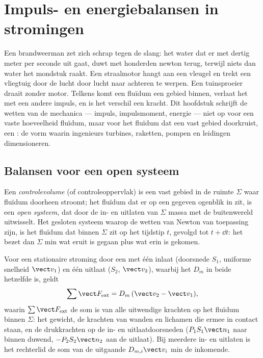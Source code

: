 \chapter{Impuls- en energiebalansen in stromingen}\label{ch:b2:flow-balances}

Een brandweerman zet zich schrap tegen de slang: het water dat er met dertig
meter per seconde uit gaat, duwt met honderden newton terug, terwijl niets
dan water het mondstuk raakt. Een straalmotor hangt aan een vleugel en trekt
een vliegtuig door de lucht door lucht naar achteren te werpen. Een
tuinsproeier draait zonder motor. Telkens komt een fluïdum een gebied
binnen, verlaat het met een andere impuls, en is het verschil een kracht.
Dit hoofdstuk schrijft de wetten van de mechanica --- impuls, impulsmoment,
energie --- niet op voor een vaste hoeveelheid fluïdum, maar voor het
fluïdum dat een vast gebied doorkruist, een \emph{}: de vorm
waarin ingenieurs turbines, raketten, pompen en leidingen dimensioneren.

\section{Balansen voor een open systeem}

\begin{definition}\label{def:b2:flow-balances:cv}
Een \emph{controlevolume} (of controleoppervlak) is een vast gebied in de
ruimte $\Sigma$ waar fluïdum doorheen stroomt; het fluïdum dat er op een
gegeven ogenblik in zit, is een \emph{open systeem}, dat door de in- en
uitlaten van $\Sigma$ massa met de buitenwereld uitwisselt. Het gesloten
systeem waarop de wetten van Newton van toepassing zijn, is het fluïdum dat
binnen $\Sigma$ zit op het tijdstip $t$, gevolgd tot $t + \dd t$: het bezet
dan $\Sigma$ min wat eruit is gegaan plus wat erin is gekomen.
\end{definition}

\begin{theorem}\label{thm:b2:flow-balances:momentum}
Voor een stationaire stroming door een  met één inlaat
(doorsnede $S_1$, uniforme snelheid $\vect v_1$) en één uitlaat ($S_2$,
$\vect v_2$), waarbij het  $D_m$ in beide hetzelfde is, geldt
\[
\sum\vect F_{\text{ext}} = D_m\,(\vect v_2 - \vect v_1) ,
\]
waarin $\sum\vect F_{\text{ext}}$ de som is van alle uitwendige krachten op
het fluïdum binnen $\Sigma$: het gewicht, de krachten van wanden en lichamen
die ermee in contact staan, en de drukkrachten op de in- en
uitlaatdoorsneden ($P_1S_1\vect n_1$ naar binnen duwend, $-P_2S_2\vect n_2$
aan de uitlaat). Bij meerdere in- en uitlaten is het rechterlid de som van
de uitgaande  $D_{m,i}\vect v_i$ min de inkomende.
\end{theorem}


